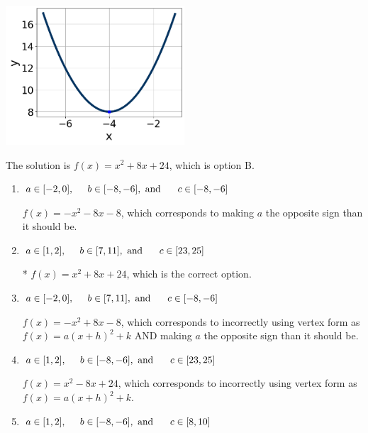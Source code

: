 \documentclass{extbook}[14pt]
\begin{document}
\begin{enumerate}
{\begin{center}
    \includegraphics[width=0.5\textwidth]{../Figures/quadraticGraphToEquationA.png}
\end{center}




The solution is \( f(x) = x^{2} +8 x + 24 \), which is option B.\begin{enumerate}[label=\Alph*.]
\item \( a \in [-2, 0], \hspace*{5mm} b \in [-8, -6], \text{ and } \hspace*{5mm} c \in [-8, -6] \)

$f(x)=-x^{2} -8 x -8$, which corresponds to making $a$ the opposite sign than it should be.
\item \( a \in [1, 2], \hspace*{5mm} b \in [7, 11], \text{ and } \hspace*{5mm} c \in [23, 25] \)

* $f(x)=x^{2} +8 x + 24$, which is the correct option.
\item \( a \in [-2, 0], \hspace*{5mm} b \in [7, 11], \text{ and } \hspace*{5mm} c \in [-8, -6] \)

$f(x)=-x^{2} +8 x -8$, which corresponds to incorrectly using vertex form as $f(x) = a(x+h)^2+k$ AND making $a$ the opposite sign than it should be.
\item \( a \in [1, 2], \hspace*{5mm} b \in [-8, -6], \text{ and } \hspace*{5mm} c \in [23, 25] \)

$f(x)=x^{2} -8 x + 24$, which corresponds to incorrectly using vertex form as $f(x) = a(x+h)^2+k$.
\item \( a \in [1, 2], \hspace*{5mm} b \in [-8, -6], \text{ and } \hspace*{5mm} c \in [8, 10] \)


\end{enumerate}}
\end{enumerate}
\end{document}
